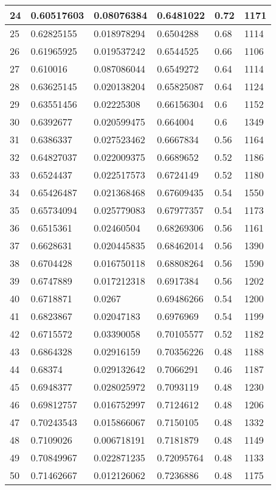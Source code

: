 \begin{longtable}{|l|l|l|l|l|l|}
24 & 0.60517603 & 0.08076384 & 0.6481022 & 0.72 & 1171 \\ \hline 
25 & 0.62825155 & 0.018978294 & 0.6504288 & 0.68 & 1114 \\ \hline 
26 & 0.61965925 & 0.019537242 & 0.6544525 & 0.66 & 1106 \\ \hline 
27 & 0.610016 & 0.087086044 & 0.6549272 & 0.64 & 1114 \\ \hline 
28 & 0.63625145 & 0.020138204 & 0.65825087 & 0.64 & 1124 \\ \hline 
29 & 0.63551456 & 0.02225308 & 0.66156304 & 0.6 & 1152 \\ \hline 
30 & 0.6392677 & 0.020599475 & 0.664004 & 0.6 & 1349 \\ \hline 
31 & 0.6386337 & 0.027523462 & 0.6667834 & 0.56 & 1164 \\ \hline 
32 & 0.64827037 & 0.022009375 & 0.6689652 & 0.52 & 1186 \\ \hline 
33 & 0.6524437 & 0.022517573 & 0.6724149 & 0.52 & 1180 \\ \hline 
34 & 0.65426487 & 0.021368468 & 0.67609435 & 0.54 & 1550 \\ \hline 
35 & 0.65734094 & 0.025779083 & 0.67977357 & 0.54 & 1173 \\ \hline 
36 & 0.6515361 & 0.02460504 & 0.68269306 & 0.56 & 1161 \\ \hline 
37 & 0.6628631 & 0.020445835 & 0.68462014 & 0.56 & 1390 \\ \hline 
38 & 0.6704428 & 0.016750118 & 0.68808264 & 0.56 & 1590 \\ \hline 
39 & 0.6747889 & 0.017212318 & 0.6917384 & 0.56 & 1202 \\ \hline 
40 & 0.6718871 & 0.0267 & 0.69486266 & 0.54 & 1200 \\ \hline 
41 & 0.6823867 & 0.02047183 & 0.6976969 & 0.54 & 1199 \\ \hline 
42 & 0.6715572 & 0.03390058 & 0.70105577 & 0.52 & 1182 \\ \hline 
43 & 0.6864328 & 0.02916159 & 0.70356226 & 0.48 & 1188 \\ \hline 
44 & 0.68374 & 0.029132642 & 0.7066291 & 0.46 & 1187 \\ \hline 
45 & 0.6948377 & 0.028025972 & 0.7093119 & 0.48 & 1230 \\ \hline 
46 & 0.69812757 & 0.016752997 & 0.7124612 & 0.48 & 1206 \\ \hline 
47 & 0.70243543 & 0.015866067 & 0.7150105 & 0.48 & 1332 \\ \hline 
48 & 0.7109026 & 0.006718191 & 0.7181879 & 0.48 & 1149 \\ \hline 
49 & 0.70849967 & 0.022871235 & 0.72095764 & 0.48 & 1133 \\ \hline 
50 & 0.71462667 & 0.012126062 & 0.7236886 & 0.48 & 1175 \\ \hline 
\end{longtable}